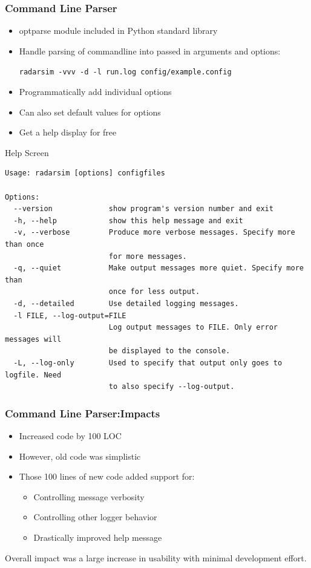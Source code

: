 \documentclass[red, hyperref={pdfpagelabels=false}]{beamer}
\begin{document}
\begin{frame}[fragile]
  \lstset{language=Python}
  \frametitle{Command Line Parser}
  \begin{itemize}
    \item optparse module included in Python standard library
    \item Handle parsing of commandline into passed in arguments and options:

    \verb$radarsim -vvv -d -l run.log config/example.config$
    \item Programmatically add individual options
    
    \item Can also set default values for options
    \item Get a help display for free
  \end{itemize}
\end{frame}

\begin{frame}[fragile]{Help Screen}
\tiny
\begin{verbatim}
Usage: radarsim [options] configfiles

Options:
  --version             show program's version number and exit
  -h, --help            show this help message and exit
  -v, --verbose         Produce more verbose messages. Specify more than once
                        for more messages.
  -q, --quiet           Make output messages more quiet. Specify more than
                        once for less output.
  -d, --detailed        Use detailed logging messages.
  -l FILE, --log-output=FILE
                        Log output messages to FILE. Only error messages will
                        be displayed to the console.
  -L, --log-only        Used to specify that output only goes to logfile. Need
                        to also specify --log-output.
\end{verbatim}
\end{frame}

\begin{frame}
  \frametitle{Command Line Parser:Impacts}
  \begin{itemize}
    \item Increased code by 100 LOC
    \item However, old code was simplistic
    \item Those 100 lines of new code added support for:
    \begin{itemize}
      \item Controlling message verbosity
      \item Controlling other logger behavior
      \item Drastically improved help message
    \end{itemize}
  \end{itemize}
  Overall impact was a large increase in usability with minimal development effort.
\end{frame}
\end{document}

